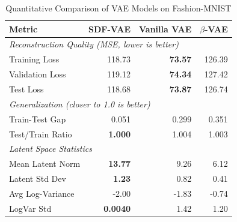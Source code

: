 \begin{table}[t]
\centering
\caption{Quantitative Comparison of VAE Models on Fashion-MNIST}
\label{tab:quantitative_results}
\begin{tabular}{lrrr}
\toprule
\textbf{Metric} & \textbf{SDF-VAE} & \textbf{Vanilla VAE} & \textbf{$\beta$-VAE} \\
\midrule
\multicolumn{4}{l}{\textit{Reconstruction Quality (MSE, lower is better)}} \\
Training Loss & 118.73 & \textbf{73.57} & 126.39 \\
Validation Loss & 119.12 & \textbf{74.34} & 127.42 \\
Test Loss & 118.68 & \textbf{73.87} & 126.74 \\
\midrule
\multicolumn{4}{l}{\textit{Generalization (closer to 1.0 is better)}} \\
Train-Test Gap & 0.051 & 0.299 & 0.351 \\
Test/Train Ratio & \textbf{1.000} & 1.004 & 1.003 \\
\midrule
\multicolumn{4}{l}{\textit{Latent Space Statistics}} \\
Mean Latent Norm & \textbf{13.77} & 9.26 & 6.12 \\
Latent Std Dev & \textbf{1.23} & 0.82 & 0.41 \\
Avg Log-Variance & -2.00 & -1.83 & -0.74 \\
LogVar Std & \textbf{0.0040} & 1.42 & 1.20 \\
\bottomrule
\end{tabular}
\end{table}
